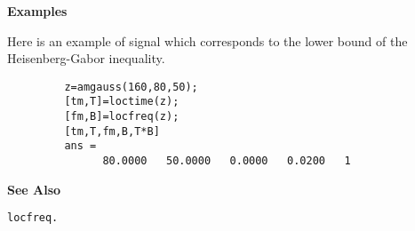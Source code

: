 {\bf \large \sf Examples}\\
\hspace*{1.5cm}
\begin{minipage}[t]{13.5cm}
Here is an example of signal which corresponds to the lower bound of the
Heisenberg-Gabor inequality.
\begin{verbatim}
         z=amgauss(160,80,50); 
         [tm,T]=loctime(z); 
         [fm,B]=locfreq(z);
         [tm,T,fm,B,T*B]
         ans = 
               80.0000   50.0000   0.0000   0.0200   1
\end{verbatim}
\end{minipage}
\vspace*{.5cm}


{\bf \large \sf See Also}\\
\hspace*{1.5cm}
\begin{minipage}[t]{13.5cm}
\begin{verbatim}
locfreq.
\end{verbatim}
\end{minipage}





